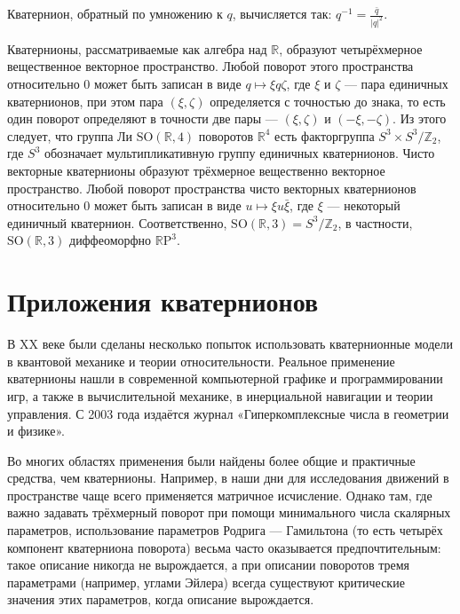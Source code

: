 \documentclass[14pt,Report]{diplomwork}
\begin{document}
Кватернион, обратный по умножению к 
$\displaystyle q$, вычисляется так: 
$\displaystyle q^{-1}={\frac {\bar {q}}{\left|q\right|^{2}}}$.



Кватернионы, рассматриваемые как алгебра над 
$\displaystyle \mathbb {R} $, образуют четырёхмерное вещественное векторное пространство. Любой поворот этого пространства относительно 
$\displaystyle 0$ может быть записан в виде 
$\displaystyle q\mapsto \xi q\zeta $, где 
$\displaystyle \xi $ и 
$\displaystyle \zeta $ — пара единичных кватернионов, при этом пара 
$\displaystyle \left(\xi ,\zeta \right)$ определяется с точностью до знака, то есть один поворот определяют в точности две пары — 
$\displaystyle \left(\xi ,\zeta \right)$ и 
$\displaystyle \left(-\xi ,-\zeta \right)$. Из этого следует, что группа Ли 
$\displaystyle {\text{SO}}\left(\mathbb {R} ,4\right)$ поворотов 
$\displaystyle \mathbb {R} ^{4}$ есть факторгруппа 
$\displaystyle S^{3}\times S^{3}/\mathbb {Z} _{2}$, где 
$\displaystyle S^{3}$ обозначает мультипликативную группу единичных кватернионов. Чисто векторные кватернионы образуют трёхмерное вещественно векторное пространство. Любой поворот пространства чисто векторных кватернионов относительно 
$\displaystyle 0$ может быть записан в виде 
$\displaystyle u\mapsto \xi u{\bar {\xi }}$, где 
$\displaystyle \xi $ — некоторый единичный кватернион. Соответственно, 
$\displaystyle {\text{SO}}\left(\mathbb {R} ,3\right)=S^{3}/\mathbb {Z} _{2}$, в частности, 
$\displaystyle {\text{SO}}\left(\mathbb {R} ,3\right)$ диффеоморфно 
$\displaystyle \mathbb {R} \mathrm {P} ^{3}$.
				\section{Приложения кватернионов}
В XX веке были сделаны несколько попыток использовать кватернионные модели в квантовой механике и теории относительности. Реальное применение кватернионы нашли в современной компьютерной графике и программировании игр, а также в вычислительной механике, в инерциальной навигации и теории управления. С 2003 года издаётся журнал «Гиперкомплексные числа в геометрии и физике».

Во многих областях применения были найдены более общие и практичные средства, чем кватернионы. Например, в наши дни для исследования движений в пространстве чаще всего применяется матричное исчисление. Однако там, где важно задавать трёхмерный поворот при помощи минимального числа скалярных параметров, использование параметров Родрига — Гамильтона (то есть четырёх компонент кватерниона поворота) весьма часто оказывается предпочтительным: такое описание никогда не вырождается, а при описании поворотов тремя параметрами (например, углами Эйлера) всегда существуют критические значения этих параметров, когда описание вырождается.
\end{document}
